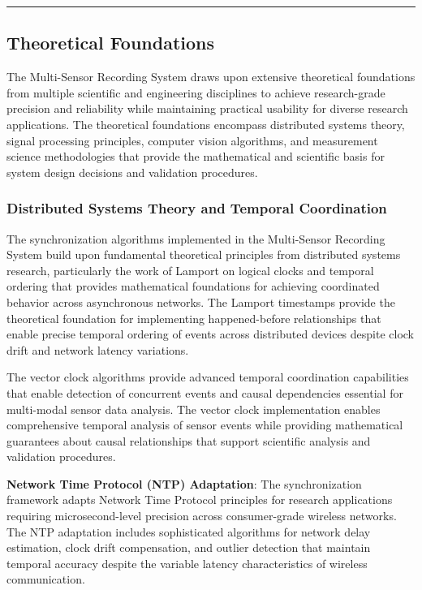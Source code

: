 \documentclass[11pt,a4paper]{article}
\begin{document}
\hrule

\subsection{Theoretical Foundations}

The Multi-Sensor Recording System draws upon extensive theoretical foundations from multiple scientific and engineering
disciplines to achieve research-grade precision and reliability while maintaining practical usability for diverse
research applications. The theoretical foundations encompass distributed systems theory, signal processing principles,
computer vision algorithms, and measurement science methodologies that provide the mathematical and scientific basis for
system design decisions and validation procedures.

\subsubsection{Distributed Systems Theory and Temporal Coordination}

The synchronization algorithms implemented in the Multi-Sensor Recording System build upon fundamental theoretical
principles from distributed systems research, particularly the work of Lamport on logical clocks and temporal ordering
that provides mathematical foundations for achieving coordinated behavior across asynchronous networks. The Lamport
timestamps provide the theoretical foundation for implementing happened-before relationships that enable precise
temporal ordering of events across distributed devices despite clock drift and network latency variations.

The vector clock algorithms provide advanced temporal coordination capabilities that enable detection of concurrent
events and causal dependencies essential for multi-modal sensor data analysis. The vector clock implementation enables
comprehensive temporal analysis of sensor events while providing mathematical guarantees about causal relationships that
support scientific analysis and validation procedures.

\textbf{Network Time Protocol (NTP) Adaptation}: The synchronization framework adapts Network Time Protocol principles for
research applications requiring microsecond-level precision across consumer-grade wireless networks. The NTP adaptation
includes sophisticated algorithms for network delay estimation, clock drift compensation, and outlier detection that
maintain temporal accuracy despite the variable latency characteristics of wireless communication.
\end{document}
